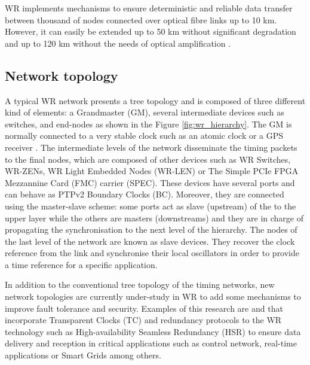 WR implements mechanisms to ensure deterministic and reliable data transfer
between thousand of nodes connected over optical fibre links up to 10 km.
However, it can easily be extended up to 50 km without significant degradation
and up to 120 km without the needs of optical amplification \cite{Kaur2017}.

\subsection{Network topology} \label{subsec:wr-net}

A typical WR network presents a tree topology and is composed of three different
kind of elements: a Grandmaster (GM), several intermediate devices such as
switches, and end-nodes as shown in the Figure \ref{fig:wr_hierarchy}. The GM
is normally connected to a very stable clock such as an atomic clock or a GPS
receiver \cite{Daniluk2012}. The intermediate levels of the network disseminate
the timing packets to the final nodes, which are composed of other devices such
as WR Switches, WR-ZENs, WR Light Embedded Nodes (WR-LEN) or The Simple PCIe FPGA Mezzannine Card (FMC) carrier (SPEC). These devices have several ports and can behave as PTPv2 Boundary Clocks (BC). Moreover, they are connected using the master-slave scheme: some ports act as slave (upstream) of the to the upper layer while the others are masters (downstreams) and they are in charge of propagating the synchronisation to the next level of the hierarchy. The nodes of the last level of the network are known as slave devices. They recover the clock reference from the link and synchronise their local oscillators in order to provide a time reference for a specific application.

In addition to the conventional tree topology of the timing networks, new
network topologies are currently under-study in WR to add some mechanisms to improve fault
tolerance and security. Examples of this research are
\cite{jlgutierrez-paper-redundancy} and \cite{jlgutierrezhsr} that incorporate Transparent Clocks
(TC) and redundancy protocols to the WR technology such as
High-availability Seamless Redundancy (HSR) to ensure data delivery and reception in critical applications such as
control network, real-time applications or Smart Grids among others.

